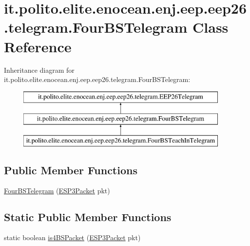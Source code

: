 \hypertarget{classit_1_1polito_1_1elite_1_1enocean_1_1enj_1_1eep_1_1eep26_1_1telegram_1_1_four_b_s_telegram}{}\section{it.\+polito.\+elite.\+enocean.\+enj.\+eep.\+eep26.\+telegram.\+Four\+B\+S\+Telegram Class Reference}
\label{classit_1_1polito_1_1elite_1_1enocean_1_1enj_1_1eep_1_1eep26_1_1telegram_1_1_four_b_s_telegram}
Inheritance diagram for it.\+polito.\+elite.\+enocean.\+enj.\+eep.\+eep26.\+telegram.\+Four\+B\+S\+Telegram\+:\begin{figure}[H]
\begin{center}
\leavevmode
\includegraphics[height=3.000000cm]{classit_1_1polito_1_1elite_1_1enocean_1_1enj_1_1eep_1_1eep26_1_1telegram_1_1_four_b_s_telegram}
\end{center}
\end{figure}
\subsection*{Public Member Functions}
\begin{DoxyCompactItemize}
\item 
\hyperlink{classit_1_1polito_1_1elite_1_1enocean_1_1enj_1_1eep_1_1eep26_1_1telegram_1_1_four_b_s_telegram_ac1cce7be08a0f8e50b5e3af868ee8bbe}{Four\+B\+S\+Telegram} (\hyperlink{classit_1_1polito_1_1elite_1_1enocean_1_1protocol_1_1serial_1_1v3_1_1network_1_1packet_1_1_e_s_p3_packet}{E\+S\+P3\+Packet} pkt)
\end{DoxyCompactItemize}
\subsection*{Static Public Member Functions}
\begin{DoxyCompactItemize}
\item 
static boolean \hyperlink{classit_1_1polito_1_1elite_1_1enocean_1_1enj_1_1eep_1_1eep26_1_1telegram_1_1_four_b_s_telegram_ab92be94cdd410654fdba69f55bdb7257}{is4\+B\+S\+Packet} (\hyperlink{classit_1_1polito_1_1elite_1_1enocean_1_1protocol_1_1serial_1_1v3_1_1network_1_1packet_1_1_e_s_p3_packet}{E\+S\+P3\+Packet} pkt)
\end{DoxyCompactItemize}
